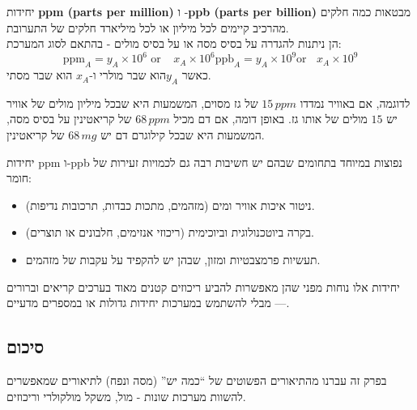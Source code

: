 \documentclass[
  hebrew,
  letterpaper,
  DIV=11,
  numbers=noendperiod]{scrreprt}
\begin{document}
{יחידות} \textbf{ppm (parts per million) {}}{ו -}\textbf{ppb (parts per
billion)} {מבטאות כמה חלקים מהרכיב קיימים לכל מיליון או לכל מיליארד
חלקים של התערובת}.\\
{הן ניתנות להגדרה על בסיס מסה או על בסיס מולים - בהתאם לסוג המערכת}:
\[{\text{ppm}_{A} = y_{A} \times 10^{6\ \ }\text{or}{\ \ \ \ \ x}_{A} \times 10^{6}
}{\text{ppb}_{A} = y_{A} \times 10^{9}\text{or}{\ \ \ \ x}_{A} \times 10^{9}
}\] {כאשר} \(y_{A}\){הוא שבר מולרי ו}-\(x_{A}\) {הוא שבר מסתי}.

לדוגמה, אם באוויר נמדדו \(15\,ppm\) של גז מסוים, המשמעות היא שבכל מיליון
מולים של אוויר יש \(15\) מולים של אותו גז. באופן דומה, אם דם מכיל
\(68\,ppm\) של קריאטינין על בסיס מסה, המשמעות היא שבכל קילוגרם דם יש
\(68\,mg\) של קריאטינין.

{יחידות} ppm {ו-}ppb {} {נפוצות במיוחד בתחומים שבהם יש חשיבות רבה גם
לכמויות זעירות של חומר}:

\begin{itemize}
\item
  {ניטור איכות אוויר ומים (מזהמים, מתכות כבדות, תרכובות נדיפות)}.
\item
  {בקרה ביוטכנולוגית וביוכימית (ריכוזי אנזימים, חלבונים או תוצרים)}.
\item
  {תעשיות פרמצבטיות ומזון, שבהן יש להקפיד על עקבות של מזהמים}.
\end{itemize}

{יחידות אלו נוחות מפני שהן מאפשרות להביע ריכוזים קטנים מאוד בערכים
קריאים וברורים --- מבלי להשתמש במערכות יחידות גדולות או במספרים מדעיים}.

\subsection{\texorpdfstring{{סיכום}}{סיכום}}\label{ux5e1ux5d9ux5dbux5d5ux5dd-3}

בפרק זה עברנו מהתיאורים הפשוטים של ``כמה יש'' (מסה ונפח) לתיאורים
שמאפשרים להשוות מערכות שונות - מול, משקל מולקולרי וריכוזים.
\end{document}
